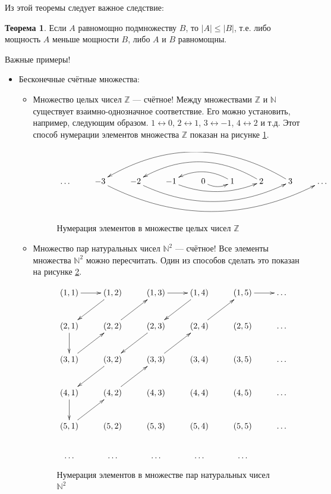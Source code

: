 \documentclass[pdftex, 12pt, a4paper]{article}
\def \mbb{\mathbb}
\def \N{\mbb N}
\def \Z{\mbb Z}
\def \lra{\leftrightarrow} %
\renewcommand{\le}{\leqslant}
\theoremstyle{definition} %
\newtheorem{myth}{Теорема}
\numberwithin{problem}{section}
\numberwithin{blits}{section}
\begin{document}
Из этой теоремы следует важное следствие:

\begin{myth}
Если $ A $ равномощно подмножеству $ B $, то $ |A| \le |B| $, т.е. либо мощность $ A$ меньше мощности $ B $, либо $ A $ и $ B $ равномощны.
\end{myth}



Важные примеры!

\begin{itemize}
\item Бесконечные счётные множества:

\begin{itemize}

\item Множество целых чисел $\Z$ --- счётное! Между множествами $\Z$ и $\N$ существует взаимно-однозначное соответствие. Его можно установить, например, следующим образом. $1 \lra 0$, $2 \lra 1$, $3 \lra -1$, $4 \lra 2$ и т.д. Этот способ нумерации элементов множества $\Z$ показан на рисунке \ref{z}.

\begin{figure}[H]
\begin{center}

\[ \xymatrix{ & & & & & & & \\
\dots & -3 \ar@/_3pc/[rrrrrrr] & -2 \ar@/_2pc/[rrrrr] & -1 \ar@/_1pc/[rrr] & 0 \ar@/_/[r] & 1 \ar@/_1pc/[ll] & 2 \ar@/_2pc/[llll] & 3 \ar@/_3pc/[llllll] & \dots \\
 & & & & & & & }
\]


\caption{Нумерация элементов в множестве целых чисел $\Z$}\label{z}
\end{center}
\end{figure}

\item Множество пар натуральных чисел $\N^{2}$ --- счётное! Все элементы множества $\N^{2}$ можно пересчитать. Один из способов сделать это показан на рисунке \ref{n^2}.

\begin{figure}[H]
\begin{center}
\[ \xymatrix{
(1,1) \ar[r] &  (1,2) \ar[ld]  &  (1,3) \ar[r]  & (1,4) \ar[ld]  & (1,5)  \ar[r] & \dots  \\
(2,1) \ar[d] & (2,2) \ar[ru]  & (2,3) \ar[ld]  & (2,4) \ar[ur] & (2,5) &  \dots\\
(3,1) \ar[ru] & (3,2) \ar[ld] & (3,3) \ar[ur] & (3,4) & (3,5)  & \dots \\
(4,1) \ar[d] & (4,2) \ar[ur] & (4,3) & (4,4) & (4,5)  & \dots \\
(5,1) \ar[ur] & (5,2) & (5,3) & (5,4) & (5,5)  & \dots \\
\dots & \dots & \dots & \dots & \dots  }
\]
\caption{Нумерация элементов в множестве пар натуральных чисел $\N^2$}\label{n^2}
\end{center}
\end{figure}


\end{itemize}
\end{itemize}
\end{document}
